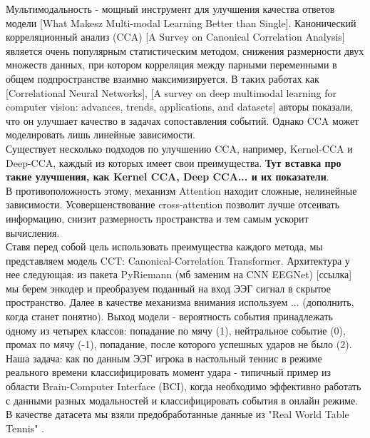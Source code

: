 \documentclass[a4paper,14pt]{article}
\theoremstyle{plain} %
\theoremstyle{definition} %
\theoremstyle{remark} %
\begin{document}
        Мультимодальность - мощный инструмент для улучшения качества ответов модели [What Makesz Multi-modal Learning Better than Single]. Канонический корреляционный анализ (CCA) [A Survey on Canonical Correlation Analysis] является очень популярным статистическим методом, снижения размерности двух множеств данных, при котором корреляция между парными переменными в общем подпространстве взаимно максимизируется. В таких работах как [Correlational Neural Networks], [A survey on deep multimodal learning for computer vision: advances, trends, applications, and datasets] авторы показали, что он улучшает качество в задачах сопоставления событий. Однако CCA может моделировать лишь линейные зависимости. \\
        Существует несколько подходов по улучшению CCA, например, Kernel-CCA и Deep-CCA, каждый из которых имеет свои преимущества.  
        \textbf{Тут вставка про такие улучшения, как Kernel CCA, Deep CCA... и их показатели}.\\
        В противоположность этому, механизм Attention находит сложные, нелинейные зависимости. Усовершенствование cross-attention позволит лучше отсеивать информацию, снизит размерность пространства и тем самым ускорит вычисления. \\
        Ставя перед собой цель использовать преимущества каждого метода, мы представляем модель CCT: Canonical-Correlation Transformer. Архитектура у нее следующая: из пакета PyRiemann (мб заменим на CNN EEGNet) [ссылка] мы берем энкодер и преобразуем поданный на вход ЭЭГ сигнал в скрытое пространство. Далее в качестве механизма внимания используем ... (дополнить, когда станет понятно). Выход модели - вероятность события принадлежать одному из четырех классов: попадание по мячу (1), нейтральное событие (0), промах по мячу (-1), попадание, после которого успешных ударов не было (2). \\    
        Наша задача: как по данным ЭЭГ игрока в настольный теннис в режиме реального времени классифицировать момент удара - типичный пример из области Brain-Computer Interface (BCI), когда необходимо эффективно работать с данными разных модальностей и классифицировать события в онлайн режиме. В качестве датасета мы взяли предобработанные данные из "Real World Table Tennis" \cite{amanda2024dataset}.\\
\end{document}
